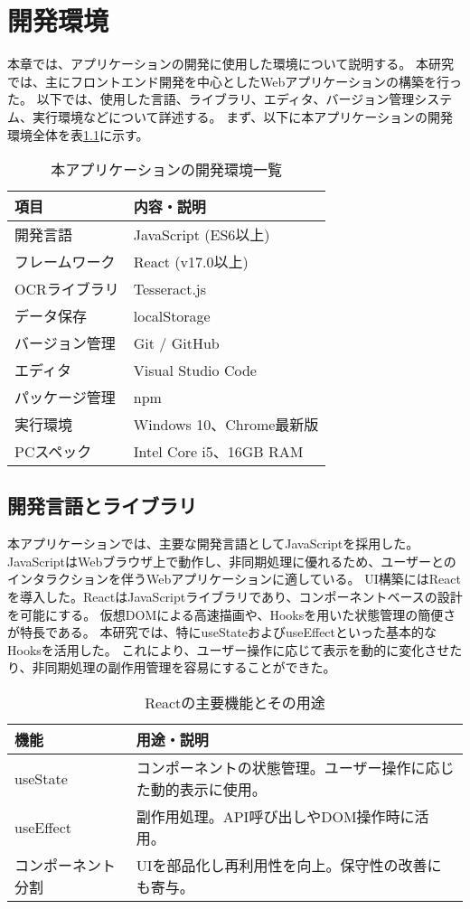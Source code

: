 \documentclass[main]{subfiles}
\begin{document}
\chapter{開発環境}
\label{cha:environment}
本章では、アプリケーションの開発に使用した環境について説明する。
本研究では、主にフロントエンド開発を中心としたWebアプリケーションの構築を行った。
以下では、使用した言語、ライブラリ、エディタ、バージョン管理システム、実行環境などについて詳述する。
まず、以下に本アプリケーションの開発環境全体を表\ref{tab:dev_environment}に示す。

\begin{table}[htbp]
\centering
\caption{本アプリケーションの開発環境一覧}
\label{tab:dev_environment}
\begin{tabular}{ll}
\hline
項目 & 内容・説明 \\
\hline
開発言語 & JavaScript (ES6以上) \\
フレームワーク & React (v17.0以上) \\
OCRライブラリ & Tesseract.js \\
データ保存 & localStorage \\
バージョン管理 & Git / GitHub \\
エディタ & Visual Studio Code \\
パッケージ管理 & npm \\
実行環境 & Windows 10、Chrome最新版 \\
PCスペック & Intel Core i5、16GB RAM \\
\hline
\end{tabular}
\end{table}

\section{開発言語とライブラリ}

本アプリケーションでは、主要な開発言語としてJavaScriptを採用した。
JavaScriptはWebブラウザ上で動作し、非同期処理に優れるため、ユーザーとのインタラクションを伴うWebアプリケーションに適している。
UI構築にはReactを導入した。ReactはJavaScriptライブラリであり、コンポーネントベースの設計を可能にする。
仮想DOMによる高速描画や、Hooksを用いた状態管理の簡便さが特長である。
本研究では、特にuseStateおよびuseEffectといった基本的なHooksを活用した。
これにより、ユーザー操作に応じて表示を動的に変化させたり、非同期処理の副作用管理を容易にすることができた。

\begin{table}[htbp]
\centering
\caption{Reactの主要機能とその用途}
\label{tab:react_features}
\begin{tabular}{lp{9cm}}
\hline
\textbf{機能} & \textbf{用途・説明} \\
\hline
useState & コンポーネントの状態管理。ユーザー操作に応じた動的表示に使用。 \\
useEffect & 副作用処理。API呼び出しやDOM操作時に活用。 \\
コンポーネント分割 & UIを部品化し再利用性を向上。保守性の改善にも寄与。 \\
\hline
\end{tabular}
\end{table}
\end{document}
